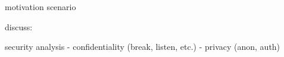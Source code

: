 
motivation
scenario

discuss:

security analysis
- confidentiality (break, listen, etc.)
- privacy (anon, auth)
